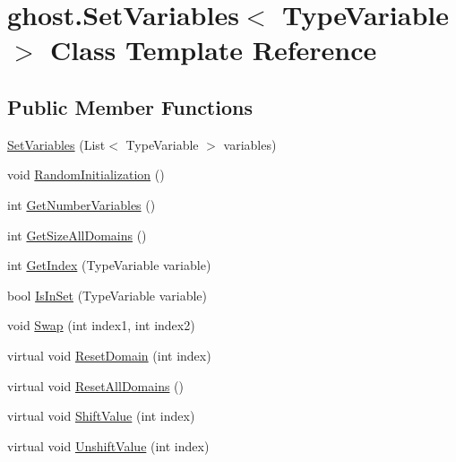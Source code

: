 \hypertarget{classghost_1_1SetVariables_3_01TypeVariable_01_4}{\section{ghost.\-Set\-Variables$<$ Type\-Variable $>$ Class Template Reference}
\label{classghost_1_1SetVariables_3_01TypeVariable_01_4}
}
\subsection*{Public Member Functions}
\begin{DoxyCompactItemize}
\item 
\hyperlink{classghost_1_1SetVariables_3_01TypeVariable_01_4_aa4d6976b36cca380b1581584047f7ca1}{Set\-Variables} (List$<$ Type\-Variable $>$ variables)
\item 
void \hyperlink{classghost_1_1SetVariables_3_01TypeVariable_01_4_a1d8990709787aadaf0e5180aa0cf7414}{Random\-Initialization} ()
\item 
int \hyperlink{classghost_1_1SetVariables_3_01TypeVariable_01_4_ab56b789dea78a2a6b831b567efc3b3d0}{Get\-Number\-Variables} ()
\item 
int \hyperlink{classghost_1_1SetVariables_3_01TypeVariable_01_4_a2473f5c049d319412e81b440493d67e8}{Get\-Size\-All\-Domains} ()
\item 
int \hyperlink{classghost_1_1SetVariables_3_01TypeVariable_01_4_a2f8e4117bea08d33024b3da31baf5a09}{Get\-Index} (Type\-Variable variable)
\item 
bool \hyperlink{classghost_1_1SetVariables_3_01TypeVariable_01_4_a3554ef33a14c339391af02d0a04723b0}{Is\-In\-Set} (Type\-Variable variable)
\item 
void \hyperlink{classghost_1_1SetVariables_3_01TypeVariable_01_4_a3b1af09bf19f7d39d57b127da543133a}{Swap} (int index1, int index2)
\item 
virtual void \hyperlink{classghost_1_1SetVariables_3_01TypeVariable_01_4_ad4382f298c7b54fb6cb03a673051700f}{Reset\-Domain} (int index)
\item 
virtual void \hyperlink{classghost_1_1SetVariables_3_01TypeVariable_01_4_a2a1663cb1d1728506ed0c28a8701b18e}{Reset\-All\-Domains} ()
\item 
virtual void \hyperlink{classghost_1_1SetVariables_3_01TypeVariable_01_4_a4e762f134c7e90bf3aeb8f26d976dbe6}{Shift\-Value} (int index)
\item 
virtual void \hyperlink{classghost_1_1SetVariables_3_01TypeVariable_01_4_a67a402616d76235dd929099ebbe321a9}{Unshift\-Value} (int index)

\end{DoxyCompactItemize}
